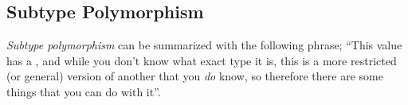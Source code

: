 \subsection{Subtype Polymorphism}\label{subsec:Subtype_Polymorphism}
\begin{definition}\label{def:Subtype_Polymorphism}
  \emph{Subtype polymorphism} can be summarized with the following phrase; ``This value has a , and while you don't know what exact type it is, this  is a more restricted (or general) version of another  that you \textit{do} know, so therefore there are some things that you can do with it''.
\end{definition}



